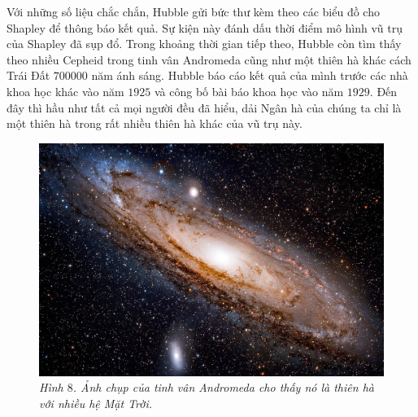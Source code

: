\begin{multicols}{2}
	\vskip 0.1cm
	Với những số liệu chắc chắn, Hubble gửi bức thư kèm theo các biểu đồ cho Shapley để thông báo kết quả. Sự kiện này đánh dấu thời điểm mô hình vũ trụ của Shapley đã sụp đổ. Trong khoảng thời gian tiếp theo, Hubble còn tìm thấy theo nhiều Cepheid trong tinh vân Andromeda cũng như một thiên hà khác cách Trái Đất $700000$ năm ánh sáng. Hubble báo cáo kết quả của mình trước các nhà khoa học khác vào năm $1925$ và công bố bài báo khoa học vào năm $1929$. Đến đây thì hầu như tất cả mọi người đều đã hiểu, dải Ngân hà của chúng ta chỉ là một thiên hà trong rất nhiều thiên hà khác của vũ trụ này.
	\begin{figure}[H]
		\vspace*{-5pt}
		\centering
		\captionsetup{labelformat= empty, justification=centering}
		\includegraphics[width= 1\linewidth]{11}
		\caption{\small\textit{\color{timhieukhoahoc}Hình $8$. Ảnh chụp của tinh vân Andromeda cho thấy nó là thiên hà với nhiều hệ Mặt Trời.}}
		\vspace*{-10pt}
	\end{figure}

\end{multicols}
